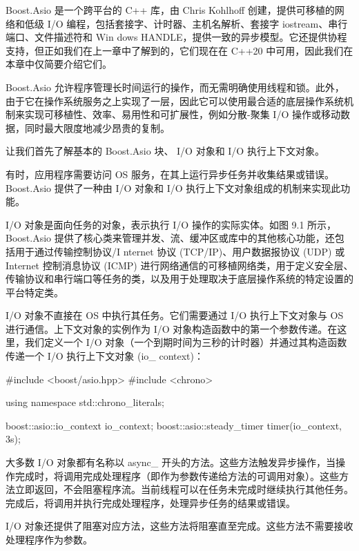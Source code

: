 
Boost.Asio 是一个跨平台的 C++ 库，由 Chris Kohlhoff 创建，提供可移植的网络和低级 I/O 编程，包括套接字、计时器、主机名解析、套接字 iostream、串行端口、文件描述符和 Win dows HANDLE，提供一致的异步模型。它还提供协程支持，但正如我们在上一章中了解到的，它们现在在 C++20 中可用，因此我们在本章中仅简要介绍它们。

Boost.Asio 允许程序管理长时间运行的操作，而无需明确使用线程和锁。此外，由于它在操作系统服务之上实现了一层，因此它可以使用最合适的底层操作系统机制来实现可移植性、效率、易用性和可扩展性，例如分散-聚集 I/O 操作或移动数据，同时最大限度地减少昂贵的复制。

让我们首先了解基本的 Boost.Asio 块、 I/O 对象和 I/O 执行上下文对象。


有时，应用程序需要访问 OS 服务，在其上运行异步任务并收集结果或错误。 Boost.Asio 提供了一种由 I/O 对象和 I/O 执行上下文对象组成的机制来实现此功能。

I/O 对象是面向任务的对象，表示执行 I/O 操作的实际实体。如图 9.1 所示， Boost.Asio 提供了核心类来管理并发、流、缓冲区或库中的其他核心功能，还包括用于通过传输控制协议/I nternet 协议 (TCP/IP)、用户数据报协议 (UDP) 或 Internet 控制消息协议 (ICMP) 进行网络通信的可移植网络类，用于定义安全层、传输协议和串行端口等任务的类，以及用于处理取决于底层操作系统的特定设置的平台特定类。


I/O 对象不直接在 OS 中执行其任务。它们需要通过 I/O 执行上下文对象与 OS 进行通信。上下文对象的实例作为 I/O 对象构造函数中的第一个参数传递。在这里，我们定义一个 I/O 对象（一个到期时间为三秒的计时器）并通过其构造函数传递一个 I/O 执行上下文对象 (io\_ context)：

\begin{cpp}
#include <boost/asio.hpp>
#include <chrono>

using namespace std::chrono_literals;

boost::asio::io_context io_context;
boost::asio::steady_timer timer(io_context, 3s);
\end{cpp}

大多数 I/O 对象都有名称以 async\_ 开头的方法。这些方法触发异步操作，当操作完成时，将调用完成处理程序（即作为参数传递给方法的可调用对象）。这些方法立即返回，不会阻塞程序流。当前线程可以在任务未完成时继续执行其他任务。完成后，将调用并执行完成处理程序，处理异步任务的结果或错误。

I/O 对象还提供了阻塞对应方法，这些方法将阻塞直至完成。这些方法不需要接收处理程序作为参数。

